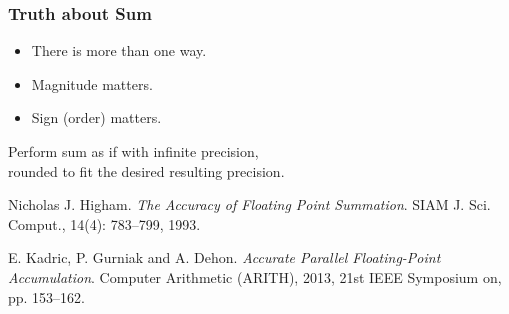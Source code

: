\begin{frame}

\frametitle{Truth about Sum}

\begin{itemize}

\item There is more than one way.

\item Magnitude matters.

\item Sign (order) matters.

\end{itemize}

\vspace{\fill}

\begin{center}

Perform sum as if with infinite precision, \\ rounded to fit the desired
resulting precision.

\end{center}

\vspace{\fill}

\footnotesize

\begin{thebibliography}{9}

 Nicholas J. Higham. \emph{The Accuracy of Floating Point
Summation}. SIAM J. Sci. Comput., 14(4): 783--799, 1993.

 E. Kadric, P. Gurniak and A. Dehon. \emph{Accurate
Parallel Floating-Point Accumulation}. Computer Arithmetic (ARITH), 2013, 21st
IEEE Symposium on, pp. 153--162.

\end{thebibliography}

\end{frame}








